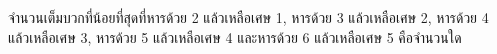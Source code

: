 ﻿%
\question จำนวนเต็มบวกที่น้อยที่สุดที่หารด้วย 2 แล้วเหลือเศษ 1, หารด้วย 3 แล้วเหลือเศษ 2, หารด้วย 4 แล้วเหลือเศษ 3, หารด้วย 5 แล้วเหลือเศษ 4 และหารด้วย 6 แล้วเหลือเศษ 5 คือจำนวนใด
\newline
{}
